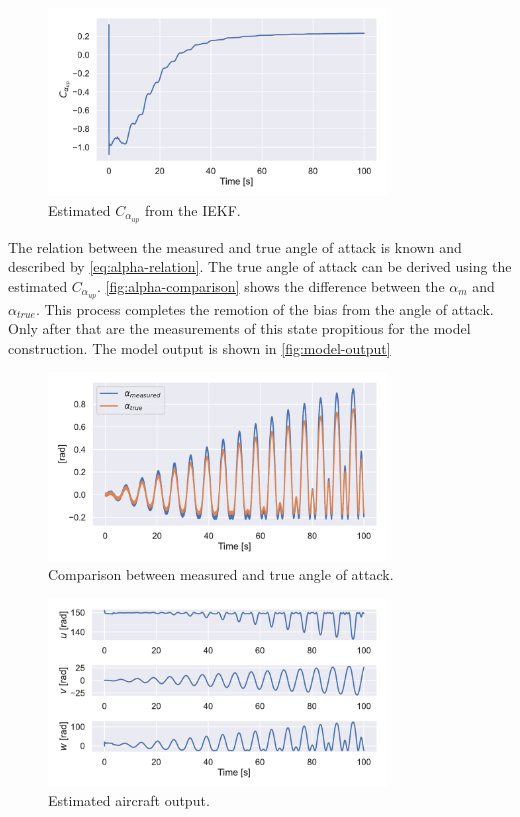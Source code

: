 \begin{figure}[h]\centering
  \includegraphics[width=0.8\textwidth]{figures/state_estimation_wash.pdf}
  \caption{Estimated $C_{\alpha_{up}}$ from the IEKF.}
  \label{fig:upwash}

\end{figure}

The relation between the measured and true angle of attack is known and described by \autoref{eq:alpha-relation}. The true angle of attack can be derived using the estimated $C_{\alpha_{up}}$. \autoref{fig:alpha-comparison} shows the difference between the $\alpha_m$ and $\alpha_{true}$. This process completes the remotion of the bias from the angle of attack. Only after that are the measurements of this state propitious for the model construction. The model output is shown in \autoref{fig:model-output}

\begin{figure}[H]
\centering
  \includegraphics[width=0.8\textwidth]{figures/state_estimation_alpha.pdf}
  \caption{Comparison between measured and true angle of attack.}
  \label{fig:alpha-comparison}
\end{figure}

\begin{figure}[h]
\centering
  \includegraphics[width=0.8\textwidth]{figures/state_estimation_output.pdf}
  \caption{Estimated aircraft output.}
  \label{fig:model-output}
\end{figure}


